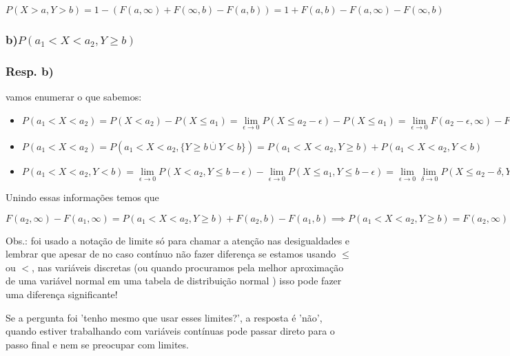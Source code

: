 \documentclass[english]{article}
\begin{document}
$P(X>a,Y>b)=1-(F(a,\infty)+F(\infty,b)-F(a,b))=1+F(a,b)-F(a,\infty)-F(\infty,b)$


\subsubsection*{\textmd{b)$P(a_{1}<X<a_{2},Y\geq b)$}}


\subsubsection*{\textmd{Resp. b)}}

vamos enumerar o que sabemos:
\begin{itemize}
\item $P(a_{1}<X<a_{2})=P(X<a_{2})-P(X\leq a_{1})=\underset{\epsilon\rightarrow0}{\lim}P(X\leq a_{2}-\epsilon)-P(X\leq a_{1})=\underset{\epsilon\rightarrow0}{\lim}F(a_{2}-\epsilon,\infty)-F(a_{1},\infty)=F(a_{2},\infty)-F(a_{1},\infty)$
\item $P(a_{1}<X<a_{2})=P(a_{1}<X<a_{2},\{Y\geq b\overset{.}{\cup}Y<b\})=P(a_{1}<X<a_{2},Y\geq b)+P(a_{1}<X<a_{2},Y<b)$
\item $P(a_{1}<X<a_{2},Y<b)=\underset{\epsilon\rightarrow0}{\lim}P(X<a_{2},Y\leq b-\epsilon)-\underset{\epsilon\rightarrow0}{\lim}P(X\leq a_{1},Y\leq b-\epsilon)=\underset{\epsilon\rightarrow0}{\lim}\underset{\delta\rightarrow0}{\lim}P(X\leq a_{2}-\delta,Y\leq b-\epsilon)-\underset{\epsilon\rightarrow0}{\lim}P(X\leq a_{1},Y\leq b-\epsilon)=\underset{\epsilon\rightarrow0}{\lim}\underset{\delta\rightarrow0}{\lim}F(a_{2}-\delta,b-\epsilon)-\underset{\epsilon\rightarrow0}{\lim}F(a_{1},b-\epsilon)=F(a_{2},b)-F(a_{1},b)$
\end{itemize}
Unindo essas informações temos que

$F(a_{2},\infty)-F(a_{1},\infty)=P(a_{1}<X<a_{2},Y\geq b)+F(a_{2},b)-F(a_{1},b)\implies P(a_{1}<X<a_{2},Y\geq b)=F(a_{2},\infty)-F(a_{1},\infty)-F(a_{2},b)+F(a_{1},b)$

\textbf{\textcompwordmark{}}

Obs.: foi usado a notação de limite só para chamar a atenção nas desigualdades
e lembrar que apesar de no caso contínuo não fazer diferença se estamos
usando $\leq$ ou $<$, nas variáveis discretas (ou quando procuramos
pela melhor aproximação de uma variável normal em uma tabela de distribuição
normal ) isso pode fazer uma diferença significante!

Se a pergunta foi 'tenho mesmo que usar esses limites?', a resposta
é 'não', quando estiver trabalhando com variáveis contínuas pode passar
direto para o passo final e nem se preocupar com limites.
\end{document}
